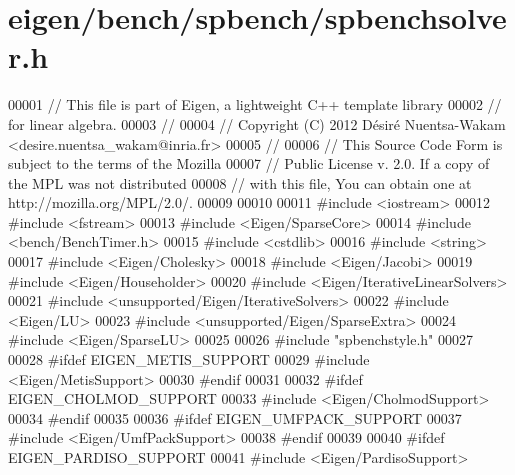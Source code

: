 \hypertarget{eigen_2bench_2spbench_2spbenchsolver_8h_source}{}\section{eigen/bench/spbench/spbenchsolver.h}
\label{eigen_2bench_2spbench_2spbenchsolver_8h_source}

\begin{DoxyCode}
00001 \textcolor{comment}{// This file is part of Eigen, a lightweight C++ template library}
00002 \textcolor{comment}{// for linear algebra.}
00003 \textcolor{comment}{//}
00004 \textcolor{comment}{// Copyright (C) 2012 Désiré Nuentsa-Wakam <desire.nuentsa\_wakam@inria.fr>}
00005 \textcolor{comment}{//}
00006 \textcolor{comment}{// This Source Code Form is subject to the terms of the Mozilla}
00007 \textcolor{comment}{// Public License v. 2.0. If a copy of the MPL was not distributed}
00008 \textcolor{comment}{// with this file, You can obtain one at http://mozilla.org/MPL/2.0/.}
00009 
00010 
00011 \textcolor{preprocessor}{#include <iostream>}
00012 \textcolor{preprocessor}{#include <fstream>}
00013 \textcolor{preprocessor}{#include <Eigen/SparseCore>}
00014 \textcolor{preprocessor}{#include <bench/BenchTimer.h>}
00015 \textcolor{preprocessor}{#include <cstdlib>}
00016 \textcolor{preprocessor}{#include <string>}
00017 \textcolor{preprocessor}{#include <Eigen/Cholesky>}
00018 \textcolor{preprocessor}{#include <Eigen/Jacobi>}
00019 \textcolor{preprocessor}{#include <Eigen/Householder>}
00020 \textcolor{preprocessor}{#include <Eigen/IterativeLinearSolvers>}
00021 \textcolor{preprocessor}{#include <unsupported/Eigen/IterativeSolvers>}
00022 \textcolor{preprocessor}{#include <Eigen/LU>}
00023 \textcolor{preprocessor}{#include <unsupported/Eigen/SparseExtra>}
00024 \textcolor{preprocessor}{#include <Eigen/SparseLU>}
00025 
00026 \textcolor{preprocessor}{#include "spbenchstyle.h"}
00027 
00028 \textcolor{preprocessor}{#ifdef EIGEN\_METIS\_SUPPORT}
00029 \textcolor{preprocessor}{#include <Eigen/MetisSupport>}
00030 \textcolor{preprocessor}{#endif}
00031 
00032 \textcolor{preprocessor}{#ifdef EIGEN\_CHOLMOD\_SUPPORT}
00033 \textcolor{preprocessor}{#include <Eigen/CholmodSupport>}
00034 \textcolor{preprocessor}{#endif}
00035 
00036 \textcolor{preprocessor}{#ifdef EIGEN\_UMFPACK\_SUPPORT}
00037 \textcolor{preprocessor}{#include <Eigen/UmfPackSupport>}
00038 \textcolor{preprocessor}{#endif}
00039 
00040 \textcolor{preprocessor}{#ifdef EIGEN\_PARDISO\_SUPPORT}
00041 \textcolor{preprocessor}{#include <Eigen/PardisoSupport>}

\end{DoxyCode}

